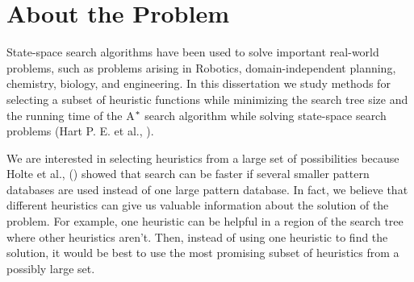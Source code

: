 

\chapter{About the Problem}\label{aboutTheProblem}
\noindent
State-space search algorithms have been used to solve important real-world problems, such as problems arising in Robotics, domain-independent planning, chemistry, biology, and engineering. In this dissertation we study methods for selecting a subset of heuristic functions while minimizing the search tree size and the running time of the A$\sp{*}$ search algorithm while solving state-space search problems (Hart P. E. et al., \citeyear{hart1968formal}).

We are interested in selecting heuristics from a large set of possibilities because Holte et al., (\citeyear{holte2006maximizing}) showed that search can be faster if several smaller pattern databases are used instead of one large pattern database. In fact, we believe that different heuristics can give us valuable information about the solution of the problem. For example, one heuristic can be helpful in a region of the search tree where other heuristics aren't. Then, instead of using one heuristic to find the solution, it would be best to use the most promising subset of heuristics from a possibly large set.

